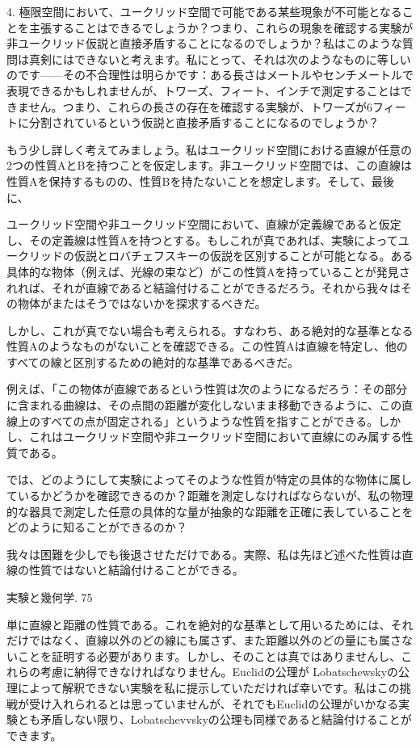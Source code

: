 \documentclass[a4paper,11pt,openany]{ltjsbook}
\begin{document}
4. 極限空間において、ユークリッド空間で可能である某些現象が不可能となることを主張することはできるでしょうか？つまり、これらの現象を確認する実験が非ユークリッド仮説と直接矛盾することになるのでしょうか？私はこのような質問は真剣にはできないと考えます。私にとって、それは次のようなものに等しいのです——その不合理性は明らかです：ある長さはメートルやセンチメートルで表現できるかもしれませんが、トワーズ、フィート、インチで測定することはできません。つまり、これらの長さの存在を確認する実験が、トワーズが6フィートに分割されているという仮説と直接矛盾することになるのでしょうか？

もう少し詳しく考えてみましょう。私はユークリッド空間における直線が任意の2つの性質AとBを持つことを仮定します。非ユークリッド空間では、この直線は性質Aを保持するものの、性質Bを持たないことを想定します。そして、最後に、


ユークリッド空間や非ユークリッド空間において、直線が定義線であると仮定し、その定義線は性質Aを持つとする。もしこれが真であれば、実験によってユークリッドの仮説とロバチェフスキーの仮説を区別することが可能となる。ある具体的な物体（例えば、光線の束など）がこの性質Aを持っていることが発見されれば、それが直線であると結論付けることができるだろう。それから我々はその物体がまたはそうではないかを探求するべきだ。

しかし、これが真でない場合も考えられる。すなわち、ある絶対的な基準となる性質Aのようなものがないことを確認できる。この性質Aは直線を特定し、他のすべての線と区別するための絶対的な基準であるべきだ。

例えば、「この物体が直線であるという性質は次のようになるだろう：その部分に含まれる曲線は、その点間の距離が変化しないまま移動できるように、この直線上のすべての点が固定される」というような性質を指すことができる。しかし、これはユークリッド空間や非ユークリッド空間において直線にのみ属する性質である。

では、どのようにして実験によってそのような性質が特定の具体的な物体に属しているかどうかを確認できるのか？距離を測定しなければならないが、私の物理的な器具で測定した任意の具体的な量が抽象的な距離を正確に表していることをどのように知ることができるのか？

我々は困難を少しでも後退させただけである。実際、私は先ほど述べた性質は直線の性質ではないと結論付けることができる。

実験と幾何学. 75

単に直線と距離の性質である。これを絶対的な基準として用いるためには、それだけではなく、直線以外のどの線にも属さず、また距離以外のどの量にも属さないことを証明する必要があります。しかし、そのことは真ではありませんし、これらの考慮に納得できなければなりません。Euclidの公理が Lobatschewskyの公理によって解釈できない実験を私に提示していただければ幸いです。私はこの挑戦が受け入れられるとは思っていませんが、それでもEuclidの公理がいかなる実験とも矛盾しない限り、Lobatschevvskyの公理も同様であると結論付けることができます。
\end{document}
